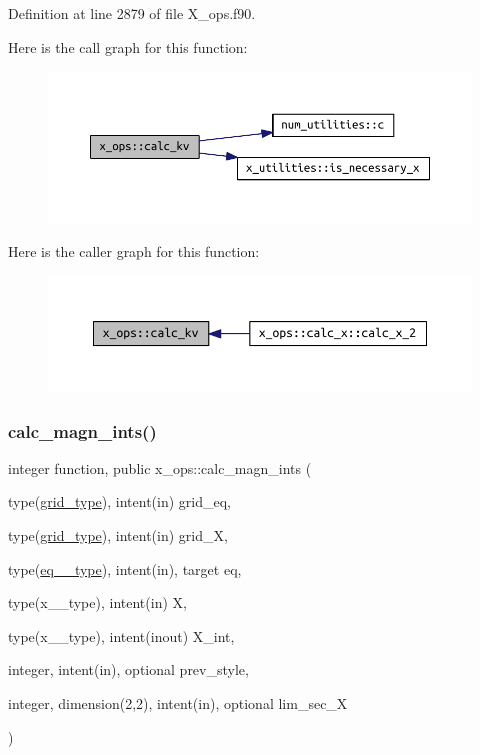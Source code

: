 Definition at line 2879 of file X\+\_\+ops.\+f90.

Here is the call graph for this function\+:\nopagebreak
\begin{figure}[H]
\begin{center}
\leavevmode
\includegraphics[width=350pt]{namespacex__ops_a045e8903230dfa0fb8b89b458d0c8ee2_cgraph}
\end{center}
\end{figure}
Here is the caller graph for this function\+:\nopagebreak
\begin{figure}[H]
\begin{center}
\leavevmode
\includegraphics[width=350pt]{namespacex__ops_a045e8903230dfa0fb8b89b458d0c8ee2_icgraph}
\end{center}
\end{figure}
\mbox{\label{namespacex__ops_a6df79622d1b95d54ab3e542751a5881d}} 
\subsubsection{\texorpdfstring{calc\+\_\+magn\+\_\+ints()}{calc\_magn\_ints()}}
{\footnotesize\ttfamily integer function, public x\+\_\+ops\+::calc\+\_\+magn\+\_\+ints (\begin{DoxyParamCaption}\item[{type(\hyperlink{structgrid__vars_1_1grid__type}{grid\+\_\+type}), intent(in)}]{grid\+\_\+eq,  }\item[{type(\hyperlink{structgrid__vars_1_1grid__type}{grid\+\_\+type}), intent(in)}]{grid\+\_\+X,  }\item[{type(\hyperlink{structeq__vars_1_1eq__2__type}{eq\+\_\+2\+\_\+type}), intent(in), target}]{eq,  }\item[{type(x\+\_\+2\+\_\+type), intent(in)}]{X,  }\item[{type(x\+\_\+2\+\_\+type), intent(inout)}]{X\+\_\+int,  }\item[{integer, intent(in), optional}]{prev\+\_\+style,  }\item[{integer, dimension(2,2), intent(in), optional}]{lim\+\_\+sec\+\_\+X }\end{DoxyParamCaption})}



